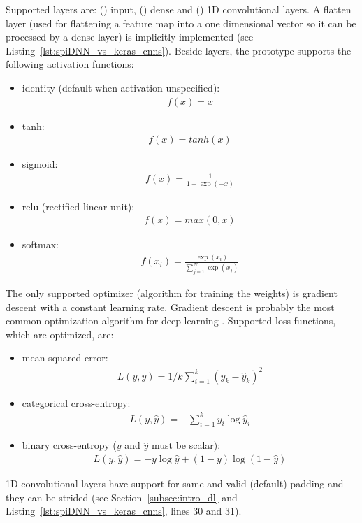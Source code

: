\documentclass[]{article}
\begin{document}
Supported layers are: () input,
() dense and () 1D convolutional layers.
A flatten layer (used for flattening a feature map into a one
dimensional vector so it can be processed by a dense layer) is
implicitly implemented (see Listing~\ref{lst:spiDNN_vs_keras_cnns}).
Beside layers, the prototype supports the following activation
functions:
\begin{itemize}
  \item identity (default when activation unspecified):
    \begin{align}
      f(x) = x
    \end{align}
  \item tanh:
    \begin{align}
      f(x) = tanh(x)
    \end{align}
  \item sigmoid:
    \begin{align}
      f(x) = \frac{1}{1 + \exp(-x)}
    \end{align}
  \item relu (rectified linear unit):
    \begin{align}
      f(x) = max(0, x)
    \end{align}
  \item softmax:
    \begin{align}
      \label{eq:softmax}
      f(x_i) = \frac{\exp(x_i)}{\sum_{j=1}^{N}\exp(x_j)}
    \end{align}
\end{itemize}
The only supported optimizer (algorithm for training the weights) is
gradient descent with a constant learning rate.
Gradient descent is probably the most common optimization algorithm
for deep learning \citep{goodfellow_et_al_2016}.
Supported loss functions, which are optimized, are:
\begin{itemize}
  \item mean squared error:
    \begin{align}
      \label{eq:mse}
      L(y, \hat{y}) = 1/k \sum_{i=1}^k(y_k - \hat{y}_k)^2
    \end{align}

  \item categorical cross-entropy:
    \begin{align}
      L(y, \hat{y}) = - \sum_{i=1}^{k} y_i \log \hat{y}_i
    \end{align}

  \item binary cross-entropy ($y$ and $\hat{y}$ must be scalar):
    \begin{align}
      L(y, \hat{y}) = - y \log \hat{y} + (1 - y) \log(1 - \hat{y})
    \end{align}
\end{itemize}
1D convolutional layers have support for same and valid (default)
padding and they can be strided (see Section~\ref{subsec:intro_dl}
and Listing~\ref{lst:spiDNN_vs_keras_cnns}, lines 30 and 31).
\end{document}
